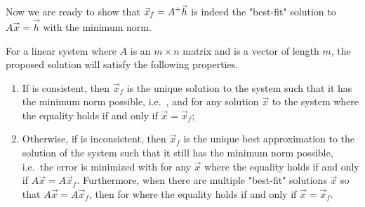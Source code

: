 Now we are ready to show that $\vec{x}_f = A^+\smash{\vec{h}}$ is indeed the "best-fit" solution to $A\vec{x} = \vec{h}$ with the minimum norm.
\begin{proper}
\label{proper:minimalsoln}
For a linear system  where $A$ is an $m \times n$ matrix and  is a vector of length $m$, the proposed solution  will satisfy the following properties.
\begin{enumerate}[label=(\alph*)]
    \item If  is consistent, then $\vec{x}_f$ is the unique solution to the system such that it has the minimum norm possible, i.e.\ , and  for any solution $\vec{x}$ to the system where the equality holds if and only if $\vec{x} = \vec{x}_f$;
    \item Otherwise, if  is inconsistent, then $\vec{x}_f$ is the unique best approximation to the solution of the system such that it still has the minimum norm possible, i.e.\ the error is minimized with  for any $\vec{x}$ where the equality holds if and only if $A\vec{x} = A\vec{x}_f$. Furthermore, when there are multiple "best-fit" solutions $\vec{x}$ so that $A\vec{x} = A\vec{x}_f$, then  for where the equality holds if and only if $\vec{x} = \vec{x}_f$.
\end{enumerate}
\end{proper}
